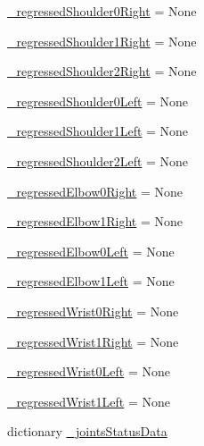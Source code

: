 \begin{DoxyCompactItemize}
\item 
\mbox{\hyperlink{namespacesteering__trajectory__following__test_ac2bfa946834d1dacf28574c91ae4771e}{\+\_\+regressed\+Shoulder0\+Right}} = None
\item 
\mbox{\hyperlink{namespacesteering__trajectory__following__test_a99e08e3f648f94190db5fd41c1b57587}{\+\_\+regressed\+Shoulder1\+Right}} = None
\item 
\mbox{\hyperlink{namespacesteering__trajectory__following__test_a812ee8dc53a47b23490c0b870b4306d8}{\+\_\+regressed\+Shoulder2\+Right}} = None
\item 
\mbox{\hyperlink{namespacesteering__trajectory__following__test_aa57323586fb6698b0cacd2d9b017a86f}{\+\_\+regressed\+Shoulder0\+Left}} = None
\item 
\mbox{\hyperlink{namespacesteering__trajectory__following__test_a42bb937133cd06c17ef8d08d642a22fa}{\+\_\+regressed\+Shoulder1\+Left}} = None
\item 
\mbox{\hyperlink{namespacesteering__trajectory__following__test_a77c32c567dcf540320f634ddaa2cbc34}{\+\_\+regressed\+Shoulder2\+Left}} = None
\item 
\mbox{\hyperlink{namespacesteering__trajectory__following__test_a6416f267e6d27bb54eebbbe24bae4384}{\+\_\+regressed\+Elbow0\+Right}} = None
\item 
\mbox{\hyperlink{namespacesteering__trajectory__following__test_a1a0ba79c0ee80a593ea6347fa9f976a3}{\+\_\+regressed\+Elbow1\+Right}} = None
\item 
\mbox{\hyperlink{namespacesteering__trajectory__following__test_a0c2e5a2ca871b8fadbdbc9963a00e5bd}{\+\_\+regressed\+Elbow0\+Left}} = None
\item 
\mbox{\hyperlink{namespacesteering__trajectory__following__test_ac025f01349e0c59c2cd72c8deb780132}{\+\_\+regressed\+Elbow1\+Left}} = None
\item 
\mbox{\hyperlink{namespacesteering__trajectory__following__test_a18e9c920e52116ab6bddb3d45eb237ef}{\+\_\+regressed\+Wrist0\+Right}} = None
\item 
\mbox{\hyperlink{namespacesteering__trajectory__following__test_a3ebfbc22a790ede2aadcbbaccdfb44e8}{\+\_\+regressed\+Wrist1\+Right}} = None
\item 
\mbox{\hyperlink{namespacesteering__trajectory__following__test_a90d130565b37986a1cdd3a295108d452}{\+\_\+regressed\+Wrist0\+Left}} = None
\item 
\mbox{\hyperlink{namespacesteering__trajectory__following__test_a0ef037ff09cf0d447c29b3f563f88602}{\+\_\+regressed\+Wrist1\+Left}} = None
\item 
dictionary \mbox{\hyperlink{namespacesteering__trajectory__following__test_a3d941037e2aebba9bac0d806d60ddb56}{\+\_\+joints\+Status\+Data}}
\end{DoxyCompactItemize}


